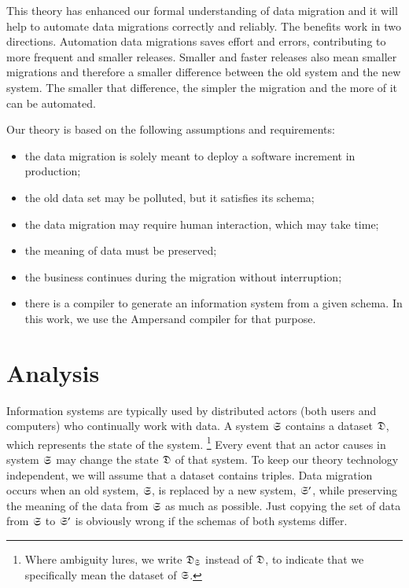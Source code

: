 \documentclass{elsarticle}
\begin{document}
   This theory has enhanced our formal understanding of data migration and it will help to automate data migrations correctly and reliably.
   The benefits work in two directions.
   Automation data migrations saves effort and errors,
   contributing to more frequent and smaller releases.
   Smaller and faster releases also mean smaller migrations
   and therefore a smaller difference between the old system and the new system.
   The smaller that difference, the simpler the migration and the more of it can be automated.

   Our theory is based on the following assumptions and requirements:
\begin{itemize}
   \item the data migration is solely meant to deploy a software increment in production;
   \item the old data set may be polluted, but it satisfies its schema;
   \item the data migration may require human interaction, which may take time;
   \item the meaning of data must be preserved;
   \item the business continues during the migration without interruption;
   \item there is a compiler to generate an information system from a given schema.
         In this work, we use the Ampersand compiler for that purpose.
\end{itemize}


\section{Analysis}
   Information systems are typically used by distributed actors (both users and computers) who continually work with data.
   A system $\mathfrak{S}$ contains a dataset $\mathfrak{D}$, which represents the state of the system.%
\footnote{Where ambiguity lures, we write $\mathfrak{D}_{\mathfrak{S}}$ instead of $\mathfrak{D}$, to indicate that we specifically mean the dataset of $\mathfrak{S}$.}
   Every event that an actor causes in system $\mathfrak{S}$ may change the state $\mathfrak{D}$ of that system.
   To keep our theory technology independent, we will assume that a dataset contains triples.
   Data migration occurs when an old system, $\mathfrak{S}$, is replaced by a new system, $\mathfrak{S}'$,
   while preserving the meaning of the data from $\mathfrak{S}$ as much as possible.
   Just copying the set of data from $\mathfrak{S}$ to $\mathfrak{S}'$ is obviously wrong if the schemas of both systems differ.
\end{document}
